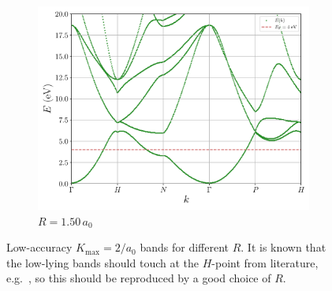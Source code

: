 \documentclass[a4paper,DIV=12,english]{scrartcl}
\begin{document}
\begin{figure}
\begin{subfigure}{0.49\textwidth}
        \includegraphics[width=\textwidth]{../plots/bs_2_R_150.pdf}
        \caption{$R=1.50\,a_0$}
        \label{subfig:bs_2_150}
    \end{subfigure}
    \caption{Low-accuracy $K_\text{max} = 2/a_0$ bands for different $R$. It is known that the low-lying bands should touch at the $H$-point from literature, e.g.~\cite{perdew_li}, so this should be reproduced by a good choice of $R$.}
    \label{fig:bs_var_R}
\end{figure}
\end{document}
